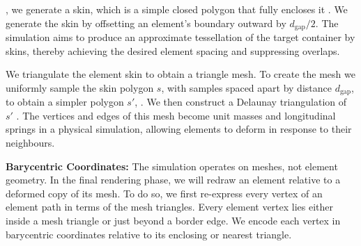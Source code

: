 , we generate a skin, 
which is a simple closed polygon that fully encloses it .
We generate the skin by offsetting 
an element's boundary outward by $d_\mathrm{gap}/2$. 
The simulation aims to produce an approximate tessellation of the target
container by  skins, thereby achieving the desired element spacing and
suppressing overlaps.

We triangulate the element skin to obtain a triangle mesh.
To create the mesh we uniformly sample the skin polygon $s$, with samples
spaced apart by distance $d_\mathrm{gap}$,
to obtain a simpler polygon $s'$, .
We then construct a Delaunay triangulation of $s'$ .
The vertices and edges of this mesh become unit 
masses and longitudinal
springs in a physical simulation, allowing elements to deform in response to
their neighbours.  


\textbf{Barycentric Coordinates:}
The simulation operates on meshes, not element geometry.  In the final
rendering phase, we will redraw an element relative to a deformed copy of
its mesh.  To do so, we first re-express every vertex of an element path in 
terms of the mesh triangles.  Every element vertex lies either inside a mesh
triangle or just beyond a border edge.  We encode each vertex in barycentric
coordinates relative to its enclosing or nearest triangle.

